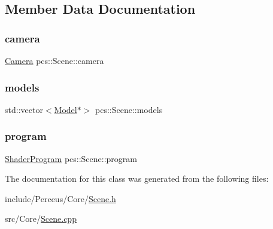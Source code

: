 \subsection{Member Data Documentation}
\mbox{\label{classpcs_1_1Scene_ad71d97a418c46759bda1c84742ab9fd3}} 
\subsubsection{\texorpdfstring{camera}{camera}}
{\footnotesize\ttfamily \hyperlink{classpcs_1_1Camera}{Camera} pcs\+::\+Scene\+::camera\hspace{0.3cm}{\ttfamily [private]}}

\mbox{\label{classpcs_1_1Scene_a5bdfb79b14332f23c93f930f0d14ee54}} 
\subsubsection{\texorpdfstring{models}{models}}
{\footnotesize\ttfamily std\+::vector$<$\hyperlink{classpcs_1_1Model}{Model}$\ast$$>$ pcs\+::\+Scene\+::models\hspace{0.3cm}{\ttfamily [private]}}

\mbox{\label{classpcs_1_1Scene_ad6a29f40f29b47277475ddf971a358ec}} 
\subsubsection{\texorpdfstring{program}{program}}
{\footnotesize\ttfamily \hyperlink{classpcs_1_1ShaderProgram}{Shader\+Program} pcs\+::\+Scene\+::program\hspace{0.3cm}{\ttfamily [protected]}}



The documentation for this class was generated from the following files\+:\begin{DoxyCompactItemize}
\item 
include/\+Perceus/\+Core/\hyperlink{Scene_8h}{Scene.\+h}\item 
src/\+Core/\hyperlink{Scene_8cpp}{Scene.\+cpp}\end{DoxyCompactItemize}
